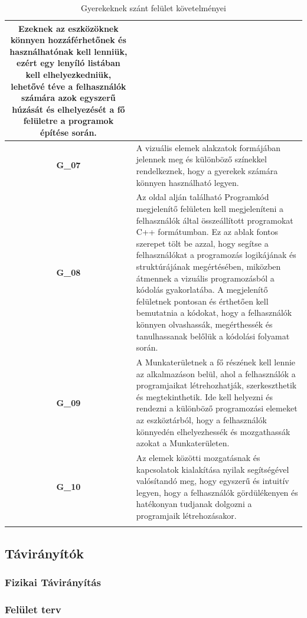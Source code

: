\documentclass{article}
\begin{document}
\begin{longtable}{|c|p{14cm}|}
Ezeknek az eszközöknek könnyen hozzáférhetőnek és használhatónak kell lenniük, ezért egy lenyíló listában kell elhelyezkedniük, lehetővé téve a felhasználók számára azok egyszerű húzását és elhelyezését a fő felületre a programok építése során.\\\hline

\textbf{G\_07} & A vizuális elemek alakzatok formájában jelennek meg és különböző színekkel rendelkeznek, hogy a gyerekek számára könnyen használható legyen. \\\hline
\textbf{G\_08} & Az oldal alján található Programkód megjelenítő felületen kell megjeleníteni a felhasználók által összeállított programokat C++ formátumban. Ez az ablak fontos szerepet tölt be azzal, hogy segítse a felhasználókat a programozás logikájának és struktúrájának megértésében, miközben átmennek a vizuális programozásból a kódolás gyakorlatába. A megjelenítő felületnek pontosan és érthetően kell bemutatnia a kódokat, hogy a felhasználók könnyen olvashassák, megérthessék és tanulhassanak belőlük a kódolási folyamat során.\\\hline

\textbf{G\_09} & A Munkaterületnek a fő részének kell lennie az alkalmazáson belül, ahol a felhasználók a programjaikat létrehozhatják, szerkeszthetik és megtekinthetik. Ide kell helyezni és rendezni a különböző programozási elemeket az eszköztárból, hogy a felhasználók könnyedén elhelyezhessék és mozgathassák azokat a Munkaterületen.\\\hline

\textbf{G\_10} & Az elemek közötti mozgatásnak és kapcsolatok kialakítása nyilak segítségével valósítandó meg, hogy egyszerű és intuitív legyen, hogy a felhasználók gördülékenyen és hatékonyan tudjanak dolgozni a programjaik létrehozásakor. \\\hline
\hline
\caption{Gyerekeknek szánt felület követelményei}
\end{longtable}
\endgroup

\subsection{Távirányítók}
\subsubsection{Fizikai Távirányítás}
\subsubsection{Felület terv}
\end{document}
